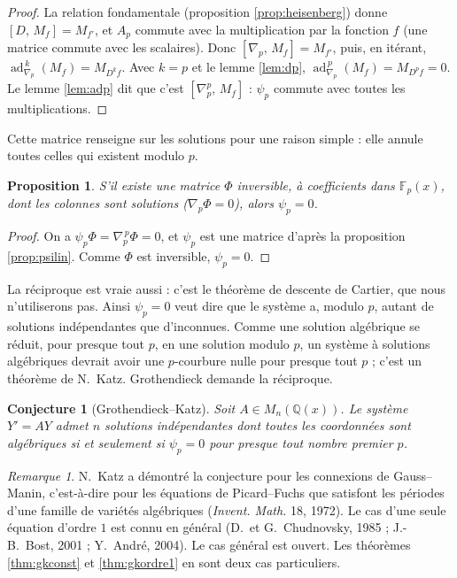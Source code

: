 \documentclass[11pt,a4paper]{article}
\theoremstyle{plain}
\newtheorem{proposition}[theoreme]{Proposition}
\newtheorem{conjecture}[theoreme]{Conjecture}
\theoremstyle{definition}
\theoremstyle{remark}
\newtheorem{remarque}[theoreme]{Remarque}
\newcommand{\Q}{\mathbb{Q}}
\newcommand{\F}{\mathbb{F}}
\DeclareMathOperator{\ad}{ad}
\newcommand{\Dx}{D}
\newcommand{\M}[1]{M_{#1}}
\newcommand{\cro}[2]{\left[#1,\,#2\right]}
\begin{document}
\begin{proof}
La relation fondamentale (proposition \ref{prop:heisenberg}) donne $\cro{\Dx}{\M f} = \M{f'}$, et $A_p$ commute avec la multiplication par la fonction $f$ (une matrice commute avec les scalaires). Donc $\cro{\nabla_p}{\M f} = \M{f'}$, puis, en itérant, $\ad_{\nabla_p}^{\,k}(\M f) = \M{\Dx^k f}$. Avec $k = p$ et le lemme \ref{lem:dp}, $\ad_{\nabla_p}^{\,p}(\M f) = \M{\Dx^p f} = 0$. Le lemme \ref{lem:adp} dit que c'est $\cro{\nabla_p^p}{\M f}$ : $\psi_p$ commute avec toutes les multiplications.
\end{proof}

Cette matrice renseigne sur les solutions pour une raison simple : elle annule toutes celles qui existent modulo $p$.

\begin{proposition}\label{prop:psisol}
S'il existe une matrice $\Phi$ inversible, à coefficients dans $\F_p(x)$, dont les colonnes sont solutions ($\nabla_p \Phi = 0$), alors $\psi_p = 0$.
\end{proposition}

\begin{proof}
On a $\psi_p \Phi = \nabla_p^{\,p} \Phi = 0$, et $\psi_p$ est une matrice d'après la proposition \ref{prop:psilin}. Comme $\Phi$ est inversible, $\psi_p = 0$.
\end{proof}

La réciproque est vraie aussi : c'est le théorème de descente de Cartier, que nous n'utiliserons pas. Ainsi $\psi_p = 0$ veut dire que le système a, modulo $p$, autant de solutions indépendantes que d'inconnues. Comme une solution algébrique se réduit, pour presque tout $p$, en une solution modulo $p$, un système à solutions algébriques devrait avoir une $p$-courbure nulle pour presque tout $p$ ; c'est un théorème de N.~Katz. Grothendieck demande la réciproque.

\begin{conjecture}[Grothendieck--Katz]\label{conj:gk}
Soit $A \in M_n(\Q(x))$. Le système $Y' = AY$ admet $n$ solutions indépendantes dont toutes les coordonnées sont algébriques si et seulement si $\psi_p = 0$ pour presque tout nombre premier $p$.
\end{conjecture}

\begin{remarque}
N.~Katz a démontré la conjecture pour les connexions de Gauss--Manin, c'est-à-dire pour les équations de Picard--Fuchs que satisfont les périodes d'une famille de variétés algébriques (\emph{Invent. Math.} 18, 1972). Le cas d'une seule équation d'ordre $1$ est connu en général (D.~et G.~Chudnovsky, 1985 ; J.-B.~Bost, 2001 ; Y.~André, 2004). Le cas général est ouvert. Les théorèmes \ref{thm:gkconst} et \ref{thm:gkordre1} en sont deux cas particuliers.
\end{remarque}
\end{document}
